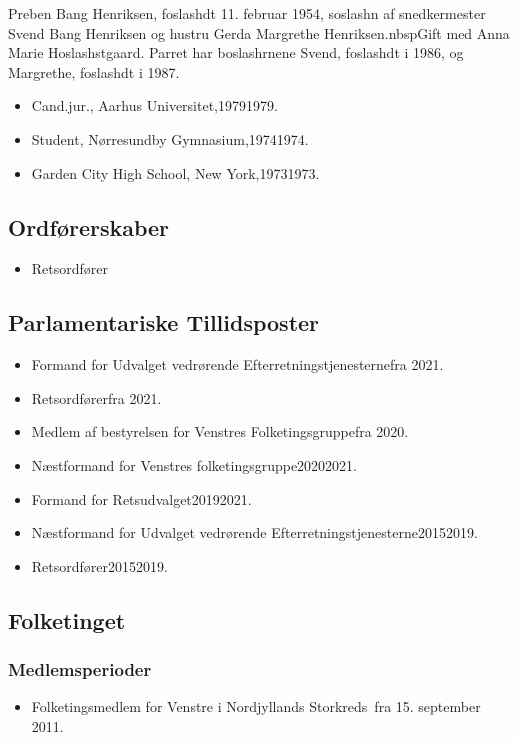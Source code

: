 \documentclass[11pt, a4paper]{awesome-cv}
\begin{document}
\makecvheader[R]
\makelettertitle
\begin{cvletter}
Preben Bang Henriksen, foslashdt 11. februar 1954, soslashn af snedkermester Svend Bang Henriksen og hustru Gerda Margrethe Henriksen.nbspGift med Anna Marie Hoslashstgaard. Parret har boslashrnene Svend, foslashdt i 1986, og Margrethe, foslashdt i 1987.

\begin{itemize}
\item Cand.jur., Aarhus Universitet,19791979.
\item Student, Nørresundby Gymnasium,19741974.
\item Garden City High School, New York,19731973.
\end{itemize}
\subsection*{Ordførerskaber}
\begin{itemize}
\item Retsordfører
\end{itemize}
\subsection*{Parlamentariske Tillidsposter}
\begin{itemize}
\item Formand for Udvalget vedrørende Efterretningstjenesternefra 2021.
\item Retsordførerfra 2021.
\item Medlem af bestyrelsen for Venstres Folketingsgruppefra 2020.
\item Næstformand for Venstres folketingsgruppe20202021.
\item Formand for Retsudvalget20192021.
\item Næstformand for Udvalget vedrørende Efterretningstjenesterne20152019.
\item Retsordfører20152019.
\end{itemize}
\subsection*{Folketinget}
\subsubsection*{Medlemsperioder}
\begin{itemize}
\item Folketingsmedlem for Venstre i Nordjyllands Storkreds fra 15. september 2011.
\end{itemize}

\end{cvletter}
\end{document}
